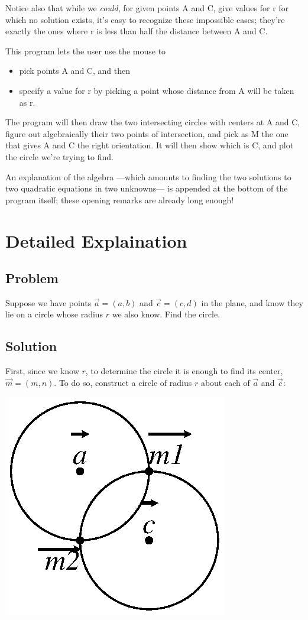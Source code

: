 \documentclass[12pt]{article}
\begin{document}
Notice also that while we {\em could}, for given points A and C, give values for r for 
which no solution exists, it's easy to recognize these impossible cases; they're exactly
the ones where r is less than half the distance between A and C.

This program lets the user use the mouse to
\begin{itemize}
\item pick points A and C, and then 
\item specify a value for r by picking a point whose distance from A will be taken as r.
\end{itemize}
The program will then draw the two intersecting circles with centers at A and C, figure
out algebraically their two points of intersection, and pick as M the one that gives A
and C the right orientation.  It will then show which is C, and plot the circle we're
trying to find.

An explanation of the algebra  ---which amounts to finding the two solutions to two
quadratic equations in two unknowns--- is appended at the bottom of the program itself;
these opening remarks are already long enough! 

\section{Detailed Explaination}

\subsection{Problem}

Suppose we have points $\vec{a} = (a,b)$ and $\vec{c} =
(c,d)$ in the plane, and know they lie on a circle whose radius $r$ we
also know.  Find the circle.

\subsection{Solution}

First, since we know $r$, to determine the circle it is enough to find
its center, $\vec{m} = (m,n)$. To do so, construct a circle of
radius $r$ about each of $\vec{a}$ and $\vec{c}$:

\includegraphics{FinnFigure1.ps}
\end{document}

